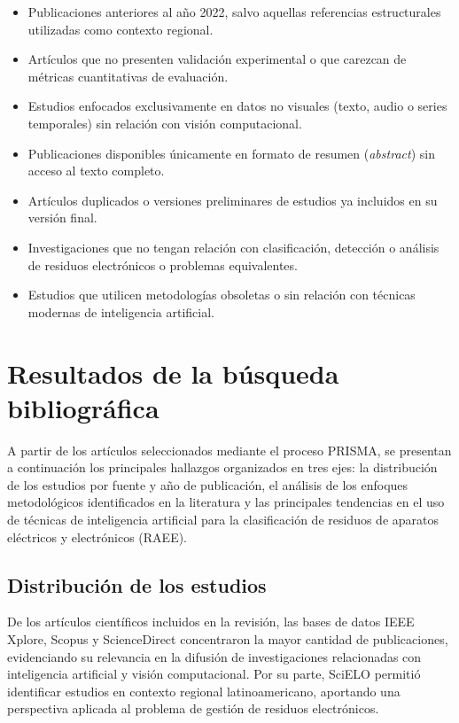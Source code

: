\begin{itemize}
    \item Publicaciones anteriores al año 2022, salvo aquellas referencias estructurales utilizadas como contexto regional.

    \item Artículos que no presenten validación experimental o que carezcan de métricas cuantitativas de evaluación.

    \item Estudios enfocados exclusivamente en datos no visuales (texto, audio o series temporales) sin relación con visión computacional.

    \item Publicaciones disponibles únicamente en formato de resumen (\textit{abstract}) sin acceso al texto completo.

    \item Artículos duplicados o versiones preliminares de estudios ya incluidos en su versión final.

    \item Investigaciones que no tengan relación con clasificación, detección o análisis de residuos electrónicos o problemas equivalentes.

    \item Estudios que utilicen metodologías obsoletas o sin relación con técnicas modernas de inteligencia artificial.
\end{itemize}


\section{Resultados de la búsqueda bibliográfica}

A partir de los artículos seleccionados mediante el proceso PRISMA, se presentan a continuación los principales hallazgos organizados en tres ejes: la distribución de los estudios por fuente y año de publicación, el análisis de los enfoques metodológicos identificados en la literatura y las principales tendencias en el uso de técnicas de inteligencia artificial para la clasificación de residuos de aparatos eléctricos y electrónicos (RAEE).

\subsection{Distribución de los estudios}

De los artículos científicos incluidos en la revisión, las bases de datos IEEE Xplore, Scopus y ScienceDirect concentraron la mayor cantidad de publicaciones, evidenciando su relevancia en la difusión de investigaciones relacionadas con inteligencia artificial y visión computacional. Por su parte, SciELO permitió identificar estudios en contexto regional latinoamericano, aportando una perspectiva aplicada al problema de gestión de residuos electrónicos.

